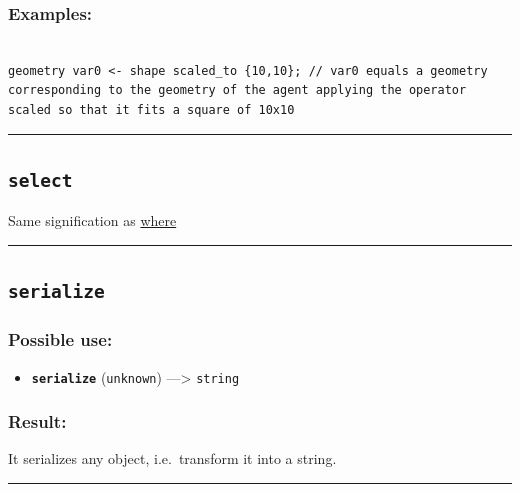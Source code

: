 \documentclass[]{book}
\providecommand{\tightlist}{%
  \setlength{\itemsep}{0pt}\setlength{\parskip}{0pt}}
\theoremstyle{definition}
\theoremstyle{definition}
\theoremstyle{definition}
\theoremstyle{remark}
\begin{document}
\subsubsection{Examples:}\label{examples-310}

\begin{verbatim}
 
geometry var0 <- shape scaled_to {10,10}; // var0 equals a geometry corresponding to the geometry of the agent applying the operator scaled so that it fits a square of 10x10
\end{verbatim}

\begin{center}\rule{0.5\linewidth}{\linethickness}\end{center}

\subsection{\texorpdfstring{\texttt{select}}{select}}\label{select}

Same signification as \href{operators-s-to-z.html\#where}{where}

\begin{center}\rule{0.5\linewidth}{\linethickness}\end{center}

\subsection{\texorpdfstring{\texttt{serialize}}{serialize}}\label{serialize}

\subsubsection{Possible use:}\label{possible-use-452}

\begin{itemize}
\tightlist
\item
  \textbf{\texttt{serialize}} (\texttt{unknown}) ---\textgreater{}
  \texttt{string}
\end{itemize}

\subsubsection{Result:}\label{result-437}

It serializes any object, i.e.~transform it into a string.

\begin{center}\rule{0.5\linewidth}{\linethickness}\end{center}
\end{document}
